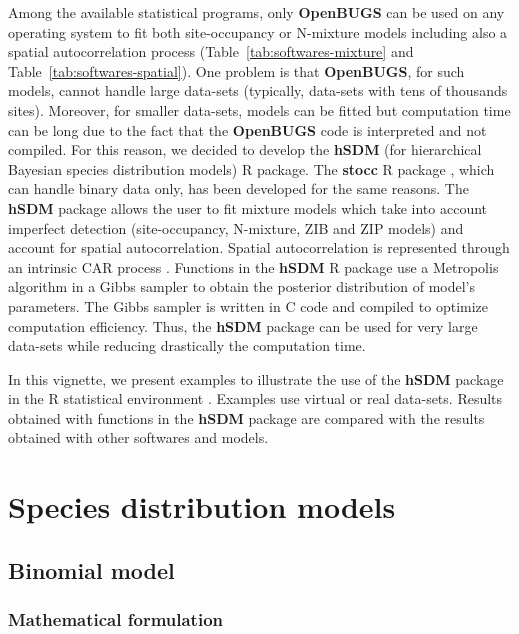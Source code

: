 \documentclass[a4paper, 12pt, leqno]{article}\usepackage[]{graphicx}\usepackage[]{color}
\begin{document}
Among the available statistical programs, only \textbf{OpenBUGS} can be used on any
operating system to fit both site-occupancy or N-mixture models including also a spatial
autocorrelation process (Table~\ref{tab:softwares-mixture} and
Table~\ref{tab:softwares-spatial}). One problem is that \textbf{OpenBUGS}, for such
models, cannot handle large data-sets (typically, data-sets with tens of thousands
sites). Moreover, for smaller data-sets, models can be fitted but computation time can be
long due to the fact that the \textbf{OpenBUGS} code is interpreted and not compiled. For
this reason, we decided to develop the \textbf{hSDM} (for hierarchical Bayesian species
distribution models) R package. The \textbf{stocc} R package
\citep{Johnson2013,Poley2014}, which can handle binary data only, has been developed for
the same reasons. The \textbf{hSDM} package allows the user to fit mixture models which
take into account imperfect detection (site-occupancy, N-mixture, ZIB and ZIP models) and
account for spatial autocorrelation. Spatial autocorrelation is represented through an
intrinsic CAR process \citep{Besag1991}. Functions in the \textbf{hSDM} R package use a
Metropolis algorithm \citep{Robert2004} in a Gibbs sampler \citep{Casella1992,
  Gelfand1990} to obtain the posterior distribution of model's parameters. The Gibbs
sampler is written in C code and compiled to optimize computation efficiency. Thus, the
\textbf{hSDM} package can be used for very large data-sets while reducing drastically the
computation time.

In this vignette, we present examples to illustrate the use of the \textbf{hSDM} package
in the R statistical environment \citep{R2014}. Examples use virtual or real
data-sets. Results obtained with functions in the \textbf{hSDM} package are compared with
the results obtained with other softwares and models.

\newpage

\section{Species distribution models}

\subsection{Binomial model}
\label{sec:binomial}

\subsubsection{Mathematical formulation}
\end{document}
